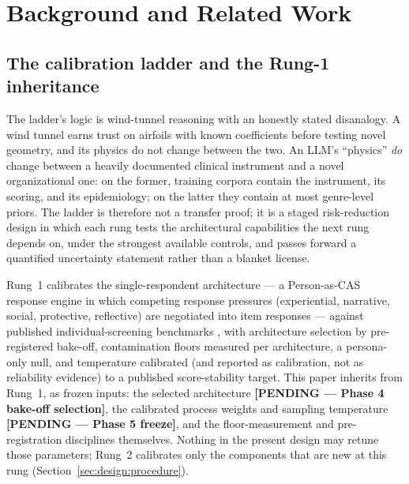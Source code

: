 \documentclass[12pt, letterpaper]{article}
\newcommand{\pending}[1]{\textcolor{blue!55!black}{\textbf{[PENDING --- #1]}}}
\begin{document}
\section{Background and Related Work}
\label{sec:background}

\subsection{The calibration ladder and the Rung-1 inheritance}
\label{sec:ladder}

The ladder's logic is wind-tunnel reasoning with an honestly stated disanalogy. A wind tunnel earns trust on airfoils with known coefficients before testing novel geometry, and its physics do not change between the two. An LLM's ``physics'' \emph{do} change between a heavily documented clinical instrument and a novel organizational one: on the former, training corpora contain the instrument, its scoring, and its epidemiology; on the latter they contain at most genre-level priors. The ladder is therefore not a transfer proof; it is a staged risk-reduction design in which each rung tests the architectural capabilities the next rung depends on, under the strongest available controls, and passes forward a quantified uncertainty statement rather than a blanket license.

Rung~1 calibrates the single-respondent architecture --- a Person-as-CAS response engine in which competing response pressures (experiential, narrative, social, protective, reflective) are negotiated into item responses --- against published individual-screening benchmarks \parencite{kroenke2001}, with architecture selection by pre-registered bake-off, contamination floors measured per architecture, a persona-only null, and temperature calibrated (and reported as calibration, not as reliability evidence) to a published score-stability target. This paper inherits from Rung~1, as frozen inputs: the selected architecture \pending{Phase 4 bake-off selection}, the calibrated process weights and sampling temperature \pending{Phase 5 freeze}, and the floor-measurement and pre-registration disciplines themselves. Nothing in the present design may retune those parameters; Rung~2 calibrates only the components that are new at this rung (Section~\ref{sec:design:procedure}).
\end{document}
